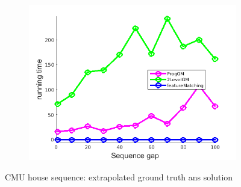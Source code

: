 \documentclass[
	fontsize=12pt,
	paper=a4,
	twoside=false,
	numbers=noenddot,
	plainheadsepline,
	toc=listof,
	toc=bibliography
]{scrartcl}
\begin{document}
\begin{figure}[h]
\begin{subfigure}[b]{0.3\textwidth}
		\includegraphics[scale=0.25]{"fig_ver2608/RealImages/HouseSeq/no_descr/using_cpd_afftrafo/ext_solution/performance/time"}  
	\end{subfigure} 	
	\caption{CMU house sequence: extrapolated ground truth ans solution}
\end{figure}
\vspace{-20pt}
\end{document}
